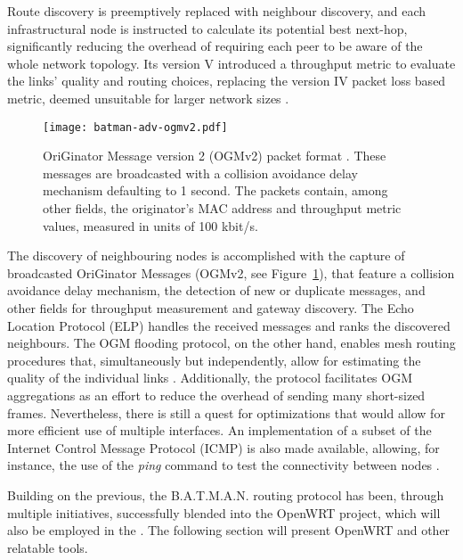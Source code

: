 Route discovery is preemptively replaced with neighbour discovery, and each infrastructural node is instructed to calculate its potential best next-hop, significantly reducing the overhead of requiring each peer to be aware of the whole network topology. Its version V introduced a throughput metric to evaluate the links' quality and routing choices, replacing the version IV packet loss based metric, deemed unsuitable for larger network sizes \cite{seither2011routing}.

\begin{figure} [ht]
  \begin{center}
  \texttt{[image: batman-adv-ogmv2.pdf]}
  \caption{OriGinator Message version 2 (OGMv2) packet format \cite{cilfone2019wireless,open-mesh-ogmv2}. These messages are broadcasted with a collision avoidance delay mechanism defaulting to 1 second. The packets contain, among other fields, the originator's MAC address and throughput metric values, measured in units of 100 kbit/s.}
  \label{fig:batman-adv-ogmv2}
  \end{center}
\end{figure}

The discovery of neighbouring nodes is accomplished with the capture of broadcasted OriGinator Messages (OGMv2, see Figure~\ref{fig:batman-adv-ogmv2}), that feature a collision avoidance delay mechanism, the detection of new or duplicate messages, and other fields for throughput measurement and gateway discovery. The Echo Location Protocol (ELP) handles the received messages and ranks the discovered neighbours. The OGM flooding protocol, on the other hand, enables mesh routing procedures that, simultaneously but independently, allow for estimating the quality of the individual links \cite{cilfone2019wireless}. Additionally, the protocol facilitates OGM aggregations as an effort to reduce the overhead of sending many short-sized frames. Nevertheless, there is still a quest for optimizations that would allow for more efficient use of multiple interfaces. An implementation of a subset of the Internet Control Message Protocol (ICMP) is also made available, allowing, for instance, the use of the \emph{ping} command to test the connectivity between nodes \cite{seither2011routing}.

Building on the previous, the B.A.T.M.A.N. routing protocol has been, through multiple initiatives, successfully blended into the OpenWRT project, which will also be employed in the \poc{}. The following section will present OpenWRT and other relatable tools.

